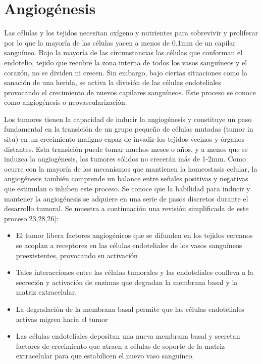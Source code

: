 \section{Angiogénesis}
\hspace{.1cm}Las células y los tejidos necesitan oxígeno y nutrientes para sobrevivir y proliferar por lo que la mayoría de las células yacen a menos de 0.1mm de un capilar sanguíneo. Bajo la mayoría de las circunstancias las células que conforman el endotelio, tejido que recubre la zona interna de todos los vasos sanguíneos y el corazón, no se dividen ni crecen. Sin embargo, bajo ciertas situaciones como la sanación de una herida, se activa la división de las células endoteliales provocando el crecimiento de nuevos capilares sanguíneos. Este proceso se conoce como angiogénesis o neovascularización.

\hspace{.1cm}Los tumores tienen la capacidad de inducir la angiogénesis y constituye un paso fundamental en la transición de un grupo pequeño de células mutadas (tumor in situ) en un crecimiento maligno capaz de invadir los tejidos vecinos y órganos distantes. Esta transición puede tomar muchos meses o años, y a menos que se induzca la angiogénesis, los tumores sólidos no crecerán más de 1-2mm. Como ocurre con la mayoría de los mecanismos que mantienen la homeostasis celular, la angiogénesis también comprende un balance entre señales positivas y negativas que estimulan o inhiben este proceso. Se conoce que la habilidad para inducir y mantener la angiogénesis se adquiere en una serie de pasos discretos durante el desarrollo tumoral. Se muestra a continuación una revisión simplificada de este proceso[23,28,26]:
\begin{itemize}
    \item El tumor libera factores angiogénicos que se difunden en los tejidos cercanos se acoplan a receptores en las células endoteliales de los vasos sanguíneos preexistentes, provocando su activación
    \item Tales interacciones entre las células tumorales y las endoteliales conlleva a la secreción y activación de enzimas que degradan la membrana basal y la matriz extracelular.
    \item La degradación de la membrana basal permite que las células endoteliales activas migren hacia el tumor
    \item Las células endoteliales depositan una nueva membrana basal y secretan factores de crecimiento que atraen a células de soporte de la matriz extracelular para que estabilicen el nuevo vaso sanguíneo.
\end{itemize}

